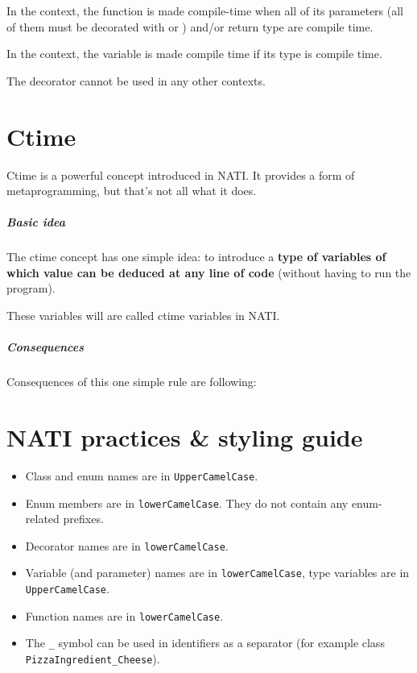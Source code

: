 In the  context, the function is made compile-time when all of its parameters (all of them must be decorated with  or ) and/or return type are compile time.

In the  context, the variable is made compile time if its type is compile time.

The decorator cannot be used in any other contexts.

\chapter{Ctime}
Ctime is a powerful concept introduced in NATI. It provides a form of metaprogramming, but that's not all what it does.

\paragraph{Basic idea}
The ctime concept has one simple idea: to introduce a \textbf{type of variables of which value can be deduced at any line of code} (without having to run the program).

These variables will are called ctime variables in NATI.

\paragraph{Consequences} Consequences of this one simple rule are following:

\chapter{NATI practices \& styling guide}

\begin{itemize}
	\item Class and enum names are in \verb|UpperCamelCase|.
	\item Enum members are in \verb|lowerCamelCase|. They do not contain any enum-related prefixes.
	\item Decorator names are in \verb|lowerCamelCase|.
	\item Variable (and parameter) names are in \verb|lowerCamelCase|, type variables are in \verb|UpperCamelCase|.
	\item Function names are in \verb|lowerCamelCase|.
	\item The \verb|_| symbol can be used in identifiers as a separator (for example class \verb|PizzaIngredient_Cheese|).
\end{itemize}

